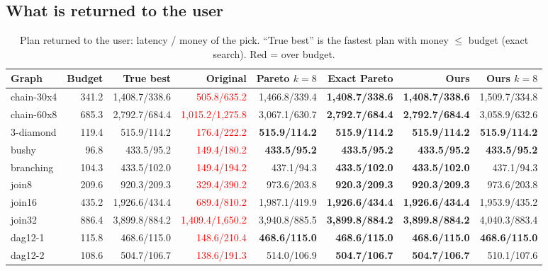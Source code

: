 \documentclass[10pt,a4paper]{article}
\begin{document}
\subsection{What is returned to the user}
{\footnotesize\setlength{\tabcolsep}{3pt}
\begin{longtable}{@{}lr|r|rrrrr@{}}
\caption{Plan returned to the user: latency / money of the pick. ``True best'' is the fastest plan with money $\le$ budget (exact search). Red = over budget.}\label{tab:picks}\\
\toprule
Graph & Budget & True best & Original & Pareto $k{=}8$ & Exact Pareto & \textbf{Ours} & Ours $k{=}8$\\
\midrule\endhead
chain-30x4 & 341.2 & 1{,}408.7/338.6 & \textcolor{red}{505.8/635.2} & 1{,}466.8/339.4 & \textbf{1{,}408.7/338.6} & \textbf{1{,}408.7/338.6} & 1{,}509.7/334.8\\
chain-60x8 & 685.3 & 2{,}792.7/684.4 & \textcolor{red}{1{,}015.2/1{,}275.8} & 3{,}067.1/630.7 & \textbf{2{,}792.7/684.4} & \textbf{2{,}792.7/684.4} & 3{,}058.9/632.6\\
3-diamond & 119.4 & 515.9/114.2 & \textcolor{red}{176.4/222.2} & \textbf{515.9/114.2} & \textbf{515.9/114.2} & \textbf{515.9/114.2} & \textbf{515.9/114.2}\\
bushy & 96.8 & 433.5/95.2 & \textcolor{red}{149.4/180.2} & \textbf{433.5/95.2} & \textbf{433.5/95.2} & \textbf{433.5/95.2} & \textbf{433.5/95.2}\\
branching & 104.3 & 433.5/102.0 & \textcolor{red}{149.4/194.2} & 437.1/94.3 & \textbf{433.5/102.0} & \textbf{433.5/102.0} & 437.1/94.3\\
join8 & 209.6 & 920.3/209.3 & \textcolor{red}{329.4/390.2} & 973.6/203.8 & \textbf{920.3/209.3} & \textbf{920.3/209.3} & 973.6/203.8\\
join16 & 435.2 & 1{,}926.6/434.4 & \textcolor{red}{689.4/810.2} & 1{,}987.1/419.9 & \textbf{1{,}926.6/434.4} & \textbf{1{,}926.6/434.4} & 1{,}953.9/435.2\\
join32 & 886.4 & 3{,}899.8/884.2 & \textcolor{red}{1{,}409.4/1{,}650.2} & 3{,}940.8/885.5 & \textbf{3{,}899.8/884.2} & \textbf{3{,}899.8/884.2} & 4{,}040.3/883.4\\
dag12-1 & 115.8 & 468.6/115.0 & \textcolor{red}{148.6/210.4} & \textbf{468.6/115.0} & \textbf{468.6/115.0} & \textbf{468.6/115.0} & \textbf{468.6/115.0}\\
dag12-2 & 108.6 & 504.7/106.7 & \textcolor{red}{138.6/191.3} & 514.0/106.9 & \textbf{504.7/106.7} & \textbf{504.7/106.7} & 510.1/107.6\\

\end{longtable}}
\end{document}
